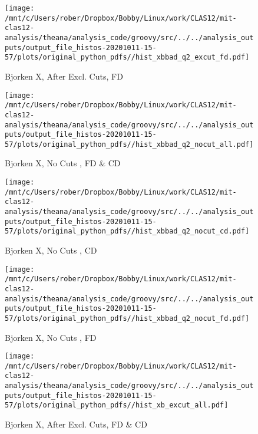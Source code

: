 \documentclass{article}
\begin{document}
\begin{landscape}
    \begin{figure}[h]
        \centering

        \texttt{[image: /mnt/c/Users/rober/Dropbox/Bobby/Linux/work/CLAS12/mit-clas12-analysis/theana/analysis\_code/groovy/src/../../analysis\_outputs/output\_file\_histos-20201011-15-57/plots/original\_python\_pdfs//hist\_xbbad\_q2\_excut\_fd.pdf]}
        \captionsetup{textformat=empty,labelformat=blank}
        \caption{Bjorken X, After Excl. Cuts, FD}
    \end{figure}
    \clearpage
    
    \begin{figure}[h]
        \centering

        \texttt{[image: /mnt/c/Users/rober/Dropbox/Bobby/Linux/work/CLAS12/mit-clas12-analysis/theana/analysis\_code/groovy/src/../../analysis\_outputs/output\_file\_histos-20201011-15-57/plots/original\_python\_pdfs//hist\_xbbad\_q2\_nocut\_all.pdf]}
        \captionsetup{textformat=empty,labelformat=blank}
        \caption{Bjorken X, No Cuts , FD \& CD}
    \end{figure}
    \clearpage
    
    \begin{figure}[h]
        \centering

        \texttt{[image: /mnt/c/Users/rober/Dropbox/Bobby/Linux/work/CLAS12/mit-clas12-analysis/theana/analysis\_code/groovy/src/../../analysis\_outputs/output\_file\_histos-20201011-15-57/plots/original\_python\_pdfs//hist\_xbbad\_q2\_nocut\_cd.pdf]}
        \captionsetup{textformat=empty,labelformat=blank}
        \caption{Bjorken X, No Cuts , CD}
    \end{figure}
    \clearpage
    
    \begin{figure}[h]
        \centering

        \texttt{[image: /mnt/c/Users/rober/Dropbox/Bobby/Linux/work/CLAS12/mit-clas12-analysis/theana/analysis\_code/groovy/src/../../analysis\_outputs/output\_file\_histos-20201011-15-57/plots/original\_python\_pdfs//hist\_xbbad\_q2\_nocut\_fd.pdf]}
        \captionsetup{textformat=empty,labelformat=blank}
        \caption{Bjorken X, No Cuts , FD}
    \end{figure}
    \clearpage
    
    \begin{figure}[h]
        \centering

        \texttt{[image: /mnt/c/Users/rober/Dropbox/Bobby/Linux/work/CLAS12/mit-clas12-analysis/theana/analysis\_code/groovy/src/../../analysis\_outputs/output\_file\_histos-20201011-15-57/plots/original\_python\_pdfs//hist\_xb\_excut\_all.pdf]}
        \captionsetup{textformat=empty,labelformat=blank}
        \caption{Bjorken X, After Excl. Cuts, FD \& CD}
    \end{figure}
    \clearpage
    

\end{landscape}
\end{document}
